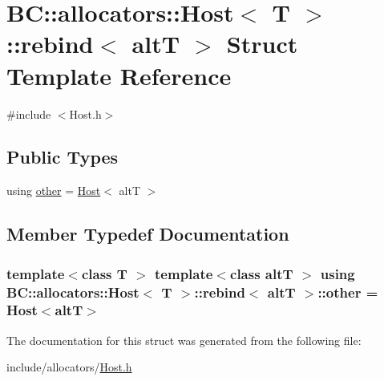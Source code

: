 \hypertarget{structBC_1_1allocators_1_1Host_1_1rebind}{}\section{BC\+:\+:allocators\+:\+:Host$<$ T $>$\+:\+:rebind$<$ altT $>$ Struct Template Reference}
\label{structBC_1_1allocators_1_1Host_1_1rebind}


{\ttfamily \#include $<$Host.\+h$>$}

\subsection*{Public Types}
\begin{DoxyCompactItemize}
\item 
using \hyperlink{structBC_1_1allocators_1_1Host_1_1rebind_a0f1a961a65925046ac937f5a42da72b9}{other} = \hyperlink{structBC_1_1allocators_1_1Host}{Host}$<$ altT $>$
\end{DoxyCompactItemize}


\subsection{Member Typedef Documentation}
\subsubsection[{\texorpdfstring{other}{other}}]{\setlength{\rightskip}{0pt plus 5cm}template$<$class T $>$ template$<$class altT $>$ using {\bf B\+C\+::allocators\+::\+Host}$<$ T $>$\+::{\bf rebind}$<$ altT $>$\+::{\bf other} =  {\bf Host}$<$altT$>$}\hypertarget{structBC_1_1allocators_1_1Host_1_1rebind_a0f1a961a65925046ac937f5a42da72b9}{}\label{structBC_1_1allocators_1_1Host_1_1rebind_a0f1a961a65925046ac937f5a42da72b9}


The documentation for this struct was generated from the following file\+:\begin{DoxyCompactItemize}
\item 
include/allocators/\hyperlink{allocators_2Host_8h}{Host.\+h}\end{DoxyCompactItemize}
